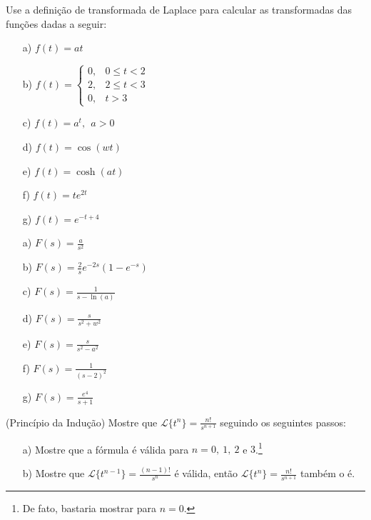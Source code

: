 \begin{exer}Use a definição de transformada de Laplace para calcular as transformadas das funções dadas a seguir:
 \begin{itemize}
  \item[a)] $f(t)=at$
  \item[b)] $f(t)=\left\{\begin{array}{ll}0, & 0\leq t< 2\\2,&  2\leq t< 3\\0,&t>3 \end{array}\right.$
  \item[c)] $f(t)=a^t,~~a>0$
  \item[d)] $f(t)=\cos(wt)$ 
  \item[e)] $f(t)=\cosh(at)$ 
  \item[f)] $f(t)=te^{2t}$ 
  \item[g)] $f(t)=e^{-t+4}$ 
 \end{itemize}
\end{exer}
\begin{resp}
 \begin{itemize}
  \item[a)] $F(s)=\frac{a}{s^2}$
  \item[b)] $F(s)=\frac{2}{s}e^{-2s}\left(1-e^{-s}\right)$ 
  \item[c)] $F(s)=\frac{1}{s-\ln(a)}$
  \item[d)] $F(s)=\frac{s}{s^2+w^2}$ 
  \item[e)] $F(s)=\frac{s}{s^2-a^2}$ 
  \item[f)] $F(s)=\frac{1}{(s-2)^2}$ 
  \item[g)] $F(s)=\frac{e^{4}}{s+1}$ 
  \end{itemize}
\end{resp}
 \begin{exer}\label{inducao_tn}(Princípio da Indução) Mostre que $\displaystyle\mathcal{L}\{t^n\}=\frac{n!}{s^{n+1}}$ seguindo os seguintes passos:
 \begin{itemize}
  \item[a)] Mostre que a fórmula é válida para $n=0,\ 1,\ 2$ e $3$.\footnote{De fato, bastaria mostrar para $n=0$.}
  \item[b)] Mostre que $\displaystyle\mathcal{L}\{t^{n-1}\}=\frac{(n-1)!}{s^{n}}$ é válida, então $\displaystyle\mathcal{L}\{t^n\}=\frac{n!}{s^{n+1}}$ também o é.
 \end{itemize}
 \end{exer}

 
